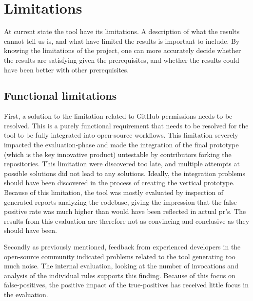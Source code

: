 \documentclass{report}
\begin{document}
\section{Limitations}
At current state the tool have its limitations. A description of what the results cannot tell us is, and what have limited the results is important to include. By knowing the limitations of the project, one can more accurately decide whether the results are satisfying given the prerequisites, and whether the results could have been better with other prerequisites. 

\subsection*{Functional limitations}
First, a solution to the limitation related to GitHub permissions needs to be resolved. This is a purely functional requirement that needs to be resolved for the tool to be fully integrated into open-source workflows. This limitation severely impacted the evaluation-phase and made the integration of the final prototype (which is the key innovative product) untestable by contributors forking the repositories. This limitation were discovered too late, and multiple attempts at possible solutions did not lead to any solutions. Ideally, the integration problems should have been discovered in the process of creating the vertical prototype. Because of this limitation, the tool was mostly evaluated by inspection of generated reports analyzing the codebase, giving the impression that the false-positive rate was much higher than would have been reflected in actual \gls{pr}'s. The results from this evaluation are therefore not as convincing and conclusive as they should have been.

Secondly as previously mentioned, feedback from experienced developers in the open-source community indicated problems related to the tool generating too much noise. The internal evaluation, looking at the number of invocations and analysis of the individual rules supports this finding. Because of this focus on false-positives, the positive impact of the true-positives has received little focus in the evaluation.  
\end{document}
